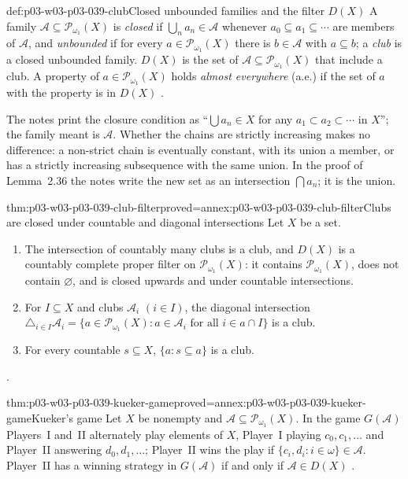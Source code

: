 \begin{hbdefinition}{def:p03-w03-p03-039-club}{Closed unbounded families and the filter \(D(X)\)}
A family \(\mathcal A\subseteq\mathcal P_{\omega_1}(X)\) is \emph{closed} if
\(\bigcup_{n}a_n\in\mathcal A\) whenever \(a_0\subseteq a_1\subseteq\cdots\)
are members of \(\mathcal A\), and \emph{unbounded} if for every
\(a\in\mathcal P_{\omega_1}(X)\) there is \(b\in\mathcal A\) with
\(a\subseteq b\); a \emph{club} is a closed unbounded family.
\(D(X)\) is the set of \(\mathcal A\subseteq\mathcal P_{\omega_1}(X)\) that
include a club. A property of \(a\in\mathcal P_{\omega_1}(X)\) holds
\emph{almost everywhere} (a.e.) if the set of \(a\) with the property is in
\(D(X)\) \cite[Def.~2.35, p.~22; p.~23]{Marker2014InfinitaryNotes}.
\end{hbdefinition}

The notes print the closure condition as ``\(\bigcup a_n\in X\) for any
\(a_1\subset a_2\subset\cdots\) in \(X\)''; the family meant is
\(\mathcal A\). Whether the chains are strictly increasing makes no
difference: a non-strict chain is eventually constant, with its union a
member, or has a strictly increasing subsequence with the same union. In the
proof of Lemma~2.36 the notes write the new set as an intersection
\(\bigcap a_n\); it is the union.

\begin{hblemma}{thm:p03-w03-p03-039-club-filter}{proved=annex:p03-w03-p03-039-club-filter}{Clubs are closed under countable and diagonal intersections}
Let \(X\) be a set.
\begin{enumerate}
\item The intersection of countably many clubs is a club, and \(D(X)\) is a
      countably complete proper filter on \(\mathcal P_{\omega_1}(X)\): it
      contains \(\mathcal P_{\omega_1}(X)\), does not contain \(\varnothing\),
      and is closed upwards and under countable intersections.
\item For \(I\subseteq X\) and clubs \(\mathcal A_i\) \((i\in I)\), the
      diagonal intersection
      \(\triangle_{i\in I}\mathcal A_i=\{a\in\mathcal P_{\omega_1}(X):a\in\mathcal A_i\text{ for all }i\in a\cap I\}\)
      is a club.
\item For every countable \(s\subseteq X\), \(\{a:s\subseteq a\}\) is a club.
\end{enumerate}
\cite[Lemmas~2.36 and~2.38, Ex.~2.37, pp.~22--23]{Marker2014InfinitaryNotes}.
\end{hblemma}

\begin{hbtheorem}{thm:p03-w03-p03-039-kueker-game}{proved=annex:p03-w03-p03-039-kueker-game}{Kueker's game}
Let \(X\) be nonempty and \(\mathcal A\subseteq\mathcal P_{\omega_1}(X)\). In
the game \(G(\mathcal A)\) Players~I and~II alternately play elements of
\(X\), Player~I playing \(c_0,c_1,\ldots\) and Player~II answering
\(d_0,d_1,\ldots\); Player~II wins the play if
\(\{c_i,d_i:i\in\omega\}\in\mathcal A\). Player~II has a winning strategy
in \(G(\mathcal A)\) if and only if \(\mathcal A\in D(X)\)
\cite[Ex.~2.39, p.~23]{Marker2014InfinitaryNotes}.
\end{hbtheorem}


